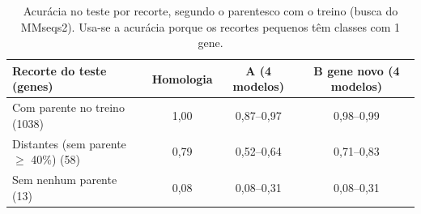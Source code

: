\begin{table}[htbp]
  \centering
  \caption{Acurácia no teste por recorte, segundo o parentesco com o treino (busca do MMseqs2). Usa-se a acurácia porque os recortes pequenos têm classes com 1 gene.}
  \label{tab:recortes_teste}
  \begin{tabular}{lccc}
    \toprule
    Recorte do teste (genes) & Homologia & A (4 modelos) & B gene novo (4 modelos) \\
    \midrule
    Com parente no treino (1038) & 1,00 & 0,87--0,97 & 0,98--0,99 \\
    Distantes (sem parente $\geq$ 40\%) (58) & 0,79 & 0,52--0,64 & 0,71--0,83 \\
    Sem nenhum parente (13) & 0,08 & 0,08--0,31 & 0,08--0,31 \\
    \bottomrule
  \end{tabular}
\end{table}
